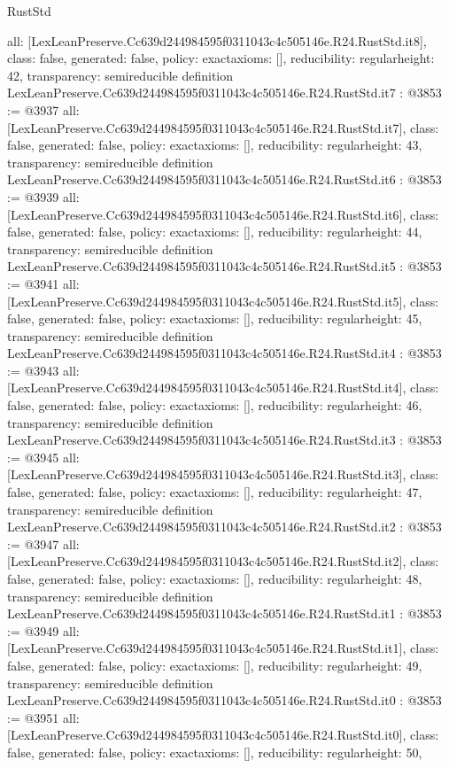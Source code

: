 \begin{lexlean}{RustStd}
\begin{coremodule}
{  all: [LexLeanPreserve.Cc639d244984595f0311043c4c505146e.R24.RustStd.it8],
  class: false,
  generated: false,
  policy: exact{axioms: []},
  reducibility: regular{height: 42},
  transparency: semireducible
}
definition LexLeanPreserve.Cc639d244984595f0311043c4c505146e.R24.RustStd.it7 : @3853 := @3937 {
  all: [LexLeanPreserve.Cc639d244984595f0311043c4c505146e.R24.RustStd.it7],
  class: false,
  generated: false,
  policy: exact{axioms: []},
  reducibility: regular{height: 43},
  transparency: semireducible
}
definition LexLeanPreserve.Cc639d244984595f0311043c4c505146e.R24.RustStd.it6 : @3853 := @3939 {
  all: [LexLeanPreserve.Cc639d244984595f0311043c4c505146e.R24.RustStd.it6],
  class: false,
  generated: false,
  policy: exact{axioms: []},
  reducibility: regular{height: 44},
  transparency: semireducible
}
definition LexLeanPreserve.Cc639d244984595f0311043c4c505146e.R24.RustStd.it5 : @3853 := @3941 {
  all: [LexLeanPreserve.Cc639d244984595f0311043c4c505146e.R24.RustStd.it5],
  class: false,
  generated: false,
  policy: exact{axioms: []},
  reducibility: regular{height: 45},
  transparency: semireducible
}
definition LexLeanPreserve.Cc639d244984595f0311043c4c505146e.R24.RustStd.it4 : @3853 := @3943 {
  all: [LexLeanPreserve.Cc639d244984595f0311043c4c505146e.R24.RustStd.it4],
  class: false,
  generated: false,
  policy: exact{axioms: []},
  reducibility: regular{height: 46},
  transparency: semireducible
}
definition LexLeanPreserve.Cc639d244984595f0311043c4c505146e.R24.RustStd.it3 : @3853 := @3945 {
  all: [LexLeanPreserve.Cc639d244984595f0311043c4c505146e.R24.RustStd.it3],
  class: false,
  generated: false,
  policy: exact{axioms: []},
  reducibility: regular{height: 47},
  transparency: semireducible
}
definition LexLeanPreserve.Cc639d244984595f0311043c4c505146e.R24.RustStd.it2 : @3853 := @3947 {
  all: [LexLeanPreserve.Cc639d244984595f0311043c4c505146e.R24.RustStd.it2],
  class: false,
  generated: false,
  policy: exact{axioms: []},
  reducibility: regular{height: 48},
  transparency: semireducible
}
definition LexLeanPreserve.Cc639d244984595f0311043c4c505146e.R24.RustStd.it1 : @3853 := @3949 {
  all: [LexLeanPreserve.Cc639d244984595f0311043c4c505146e.R24.RustStd.it1],
  class: false,
  generated: false,
  policy: exact{axioms: []},
  reducibility: regular{height: 49},
  transparency: semireducible
}
definition LexLeanPreserve.Cc639d244984595f0311043c4c505146e.R24.RustStd.it0 : @3853 := @3951 {
  all: [LexLeanPreserve.Cc639d244984595f0311043c4c505146e.R24.RustStd.it0],
  class: false,
  generated: false,
  policy: exact{axioms: []},
  reducibility: regular{height: 50},
}
\end{coremodule}
\end{lexlean}
